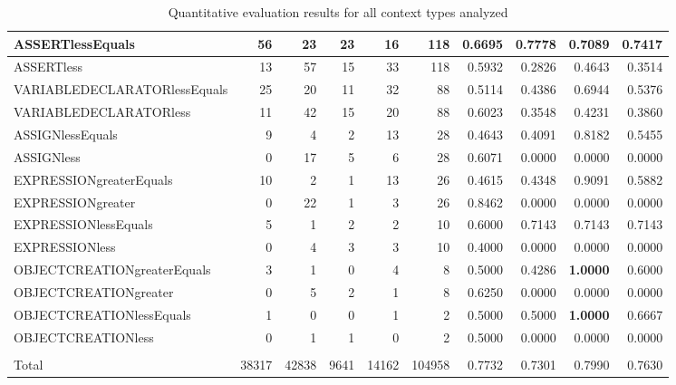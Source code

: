 \begin{appendices}
\begin{table}[htbp]
\begin{tabular}{|l|r|r|r|r|r|r|r|r|r|}
ASSERTlessEquals & 56 & 23 & 23 & 16 & 118 & 0.6695 & 0.7778 & 0.7089 & 0.7417 \\ \hline
ASSERTless & 13 & 57 & 15 & 33 & 118 & 0.5932 & 0.2826 & 0.4643 & 0.3514 \\ \hline
VARIABLEDECLARATORlessEquals & 25 & 20 & 11 & 32 & 88 & 0.5114 & 0.4386 & 0.6944 & 0.5376 \\ \hline
VARIABLEDECLARATORless & 11 & 42 & 15 & 20 & 88 & 0.6023 & 0.3548 & 0.4231 & 0.3860 \\ \hline
ASSIGNlessEquals & 9 & 4 & 2 & 13 & 28 & 0.4643 & 0.4091 & 0.8182 & 0.5455 \\ \hline
ASSIGNless & 0 & 17 & 5 & 6 & 28 & 0.6071 & 0.0000 & 0.0000 & 0.0000 \\ \hline
EXPRESSIONgreaterEquals & 10 & 2 & 1 & 13 & 26 & 0.4615 & 0.4348 & 0.9091 & 0.5882 \\ \hline
EXPRESSIONgreater & 0 & 22 & 1 & 3 & 26 & 0.8462 & 0.0000 & 0.0000 & 0.0000 \\ \hline
EXPRESSIONlessEquals & 5 & 1 & 2 & 2 & 10 & 0.6000 & 0.7143 & 0.7143 & 0.7143 \\ \hline
EXPRESSIONless & 0 & 4 & 3 & 3 & 10 & 0.4000 & 0.0000 & 0.0000 & 0.0000 \\ \hline
OBJECTCREATIONgreaterEquals & 3 & 1 & 0 & 4 & 8 & 0.5000 & 0.4286 & \textbf{1.0000} & 0.6000 \\ \hline
OBJECTCREATIONgreater & 0 & 5 & 2 & 1 & 8 & 0.6250 & 0.0000 & 0.0000 & 0.0000 \\ \hline
OBJECTCREATIONlessEquals & 1 & 0 & 0 & 1 & 2 & 0.5000 & 0.5000 & \textbf{1.0000} & 0.6667 \\ \hline
OBJECTCREATIONless & 0 & 1 & 1 & 0 & 2 & 0.5000 & 0.0000 & 0.0000 & 0.0000 \\ \hline
 &  &  &  &  &  &  &  &  &  \\ \hline
Total & 38317 & 42838 & 9641 & 14162 & 104958 & 0.7732 & 0.7301 & 0.7990 & 0.7630 \\ \hline
\end{tabular}
\caption*{Quantitative evaluation results for all context types analyzed}
\label{tab:quantitative_evaluation_all_bugs}
\end{table}



\end{appendices}
